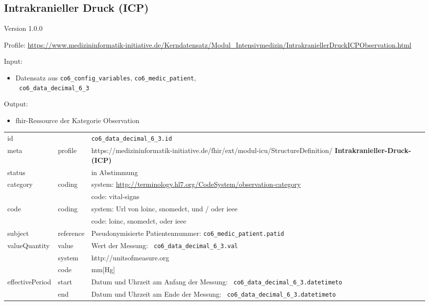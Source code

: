 \subsection{Intrakranieller Druck (ICP)} 
\noindent Version 1.0.0

\noindent Profile: \url{https://www.medizininformatik-initiative.de/Kerndatensatz/Modul_Intensivmedizin/IntrakraniellerDruckICPObservation.html}

\noindent Input:
\begin{itemize}
	\item Datensatz aus \texttt{co6\_config\_variables}, \texttt{co6\_medic\_patient}, \\ \texttt{
co6\_data\_decimal\_6\_3}
\end{itemize}
Output:
\begin{itemize}
        \item \ac{fhir}-Ressource der Kategorie \glqq Observation\grqq{}
\end{itemize}
\begin{longtable}{|l|l|p{7.5cm}|}
        \hline
        \rowcolor{lightgray} \multicolumn{3}{|l|}{Data Mapping (inhaltlich)} \\ \hline
        id &  & \texttt{co6\_data\_decimal\_6\_3.id} \\ \hline
	meta & profile & https://medizininformatik-initiative.de/fhir/ext/modul-icu/StructureDefinition/\textbf{
Intrakranieller-Druck-(ICP)} \\ \hline 
	status &  & in Abstimmung  \\ \hline 
	category & coding & system: \url{http://terminology.hl7.org/CodeSystem/observation-category} \\
\cline{3-3}
	& & code: vital-signs \\ \hline
	code & coding & system: Url von \ac{loinc}, \ac{snomedct}, und / oder \ac{ieee} \\ 
	\cline{3-3} 
	 &  & code: \ac{loinc}, \ac{snomedct}, oder \ac{ieee} \\ \hline
	subject & reference & Pseudonymisierte Patientennummer: \texttt{co6\_medic\_patient.patid} \\ \hline
	valueQuantity & value & Wert der Messung: \texttt{
co6\_data\_decimal\_6\_3.val} \\
        \cline{2-3}
         & system & http://unitsofmeasure.org \\
         \cline{2-3}
         & code & mm[Hg] \\ \hline
    effectivePeriod & start & Datum und Uhrzeit am Anfang der Messung: \texttt{
co6\_data\_decimal\_6\_3.datetimeto} \\
    \cline{2-3}
     & end & Datum und Uhrzeit am Ende der Messung: \texttt{
co6\_data\_decimal\_6\_3.datetimeto} \\ \hline
\end{longtable}


